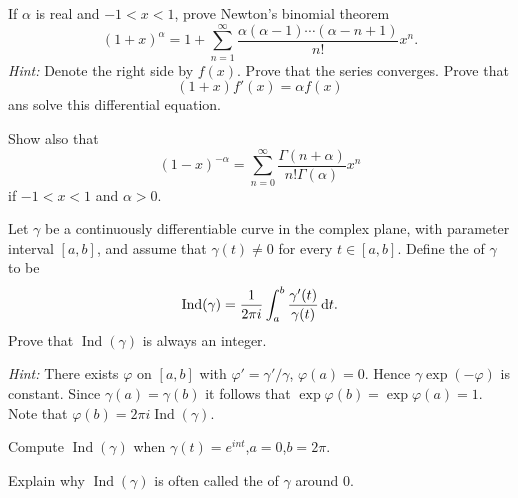 \begin{myExercise}
    \label{ex:8.22}
    If $\alpha$ is real and $-1 < x < 1$, prove Newton's binomial theorem
    \begin{equation*}
        (1+x)^{\alpha} = 1 + \sum_{n=1}^{\infty}\frac{\alpha(\alpha-1)\cdots(\alpha-n+1)}{n!}x^n .
    \end{equation*}
    \emph{Hint:} Denote the right side by $f(x)$.
    Prove that the series converges.
    Prove that 
    \begin{equation*}
        (1+x)f'(x) = \alpha f(x)
    \end{equation*}
    ans solve this differential equation.

    Show also that 
    \begin{equation*}
        (1-x)^{-\alpha} = \sum_{n=0}^{\infty}\frac{\Gamma(n+\alpha)}{n!\Gamma(\alpha)}x^n
    \end{equation*}
    if $-1<x<1$ and $\alpha>0$.
\end{myExercise}


\begin{myExercise}
    \label{ex:8.23}
    Let $\gamma$ be a continuously differentiable  curve in the complex plane, 
    with parameter interval $[a, b]$, 
    and assume that $\gamma(t) \neq 0$ for every $t \in [a, b]$. 
    Define the  of $\gamma$ to be 
    \begin{equation*}
        \operatorname{Ind}(\gamma) = \frac{1}{2\pi i}
        \int_{a}^{b} \frac{\gamma'(t)}{\gamma(t)} \d t.
    \end{equation*}
    Prove that $\operatorname{Ind}(\gamma)$ is always an integer.

    \emph{Hint:} There exists $\varphi$ on $[a,b]$ with $\varphi' = \gamma'/\gamma$, $\varphi(a)=0$.
    Hence $\gamma \exp(-\varphi)$ is constant. 
    Since $\gamma(a)=\gamma(b)$ it follows that $\exp\varphi(b)=\exp\varphi(a)=1$.
    Note that $\varphi(b)=2\pi i \operatorname{Ind}(\gamma)$.

    Compute $\operatorname{Ind}(\gamma)$ when $\gamma(t)=e^{int}$,$a=0$,$b=2\pi$.

    Explain why $\operatorname{Ind}(\gamma)$ is often called the  of $\gamma$ around 0.
\end{myExercise}